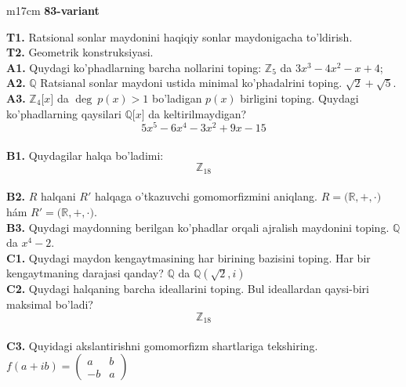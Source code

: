\documentclass{article}
\begin{document}
\begin{tabular}{m{17cm}}
\textbf{83-variant}
\newline

\textbf{T1.} Ratsional sonlar maydonini haqiqiy sonlar maydonigacha to'ldirish. \\
\textbf{T2.} Geometrik konstruksiyasi. \\
\textbf{A1.} Quydagi ko'phadlarning barcha nollarini toping:
\(\mathbb{Z}_{5}\) da \(3x^{3} - 4x^{2} - x + 4\); \\
\textbf{A2.} \(\mathbb{Q}\) Ratsianal sonlar maydoni ustida minimal ko'phadalrini toping.
\(\sqrt{2} + \sqrt{5}\). \\
\textbf{A3.} \(\mathbb{Z}_{4}\lbrack x\rbrack\) da \(\deg\ p(x) > 1\) bo'ladigan \(p(x)\) birligini toping. Quydagi ko'phadlarning qaysilari \(\mathbb{Q\lbrack}x\rbrack\) da keltirilmaydigan?
\[5x^{5} - 6x^{4} - 3x^{2} + 9x - 15\] \\
\textbf{B1.} Quydagilar halqa bo'ladimi:
\[\mathbb{Z}_{18}\] \\
\textbf{B2.} \(R\) halqani \(R'\) halqaga o'tkazuvchi gomomorfizmini aniqlang.
\(R\mathbb{= (R,} + , \cdot )\) hám \(R'\mathbb{= (R,} + , \cdot )\). \\
\textbf{B3.} Quydagi maydonning berilgan ko'phadlar orqali ajralish maydonini toping.
\(\mathbb{Q}\) da \(x^{4} - 2\). \\
\textbf{C1.} Quydagi maydon kengaytmasining har birining bazisini toping. Har bir kengaytmaning darajasi qanday?
\(\mathbb{Q}\) da \(\mathbb{Q}\left( \sqrt{2},i \right)\) \\
\textbf{C2.} Quydagi halqaning barcha ideallarini toping. Bul ideallardan qaysi-biri maksimal bo'ladi?
\[\mathbb{Z}_{18}\] \\
\textbf{C3.} Quyidagi akslantirishni gomomorfizm shartlariga tekshiring. \(f(a + ib) = \begin{pmatrix}
a & b \\
 - b & a
\end{pmatrix}\) \\

\end{tabular}
\vspace{1cm}
\end{document}
